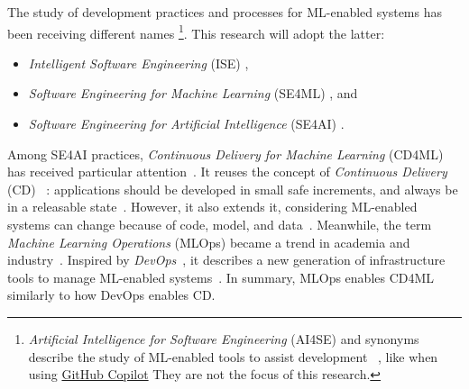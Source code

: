   The study of development practices and processes for ML-enabled systems
  has been receiving different names%
  \footnote{%
    \emph{Artificial Intelligence for Software Engineering} (AI4SE) and 
    synonyms describe the study of ML-enabled tools to assist development%
    ~\parencite{Kastner2020TeachingSystems,Martinez-Fernandez2022SoftwareSurvey},
    like when using \href{https://github.com/features/copilot}{GitHub Copilot}
    They are not the focus of this research.
  }. This research will adopt the latter:
  \begin{itemize}
    \item \emph{Intelligent Software Engineering} (ISE)
          \parencite{Andrade2021ContinuousStudy,
                     DeugoPatternsEngineering.,
                     Xie2018IntelligentEngineering},
    \item \emph{Software Engineering for Machine Learning} (SE4ML)
          \parencite{Amershi2019SoftwareStudy,
                     Lorenzoni2021MachineReview,
                     Nascimento2020SoftwareReview,
                     Martinez-Fernandez2022SoftwareSurvey,
                     Sculley2015HiddenSystems}, and
    \item \emph{Software Engineering for Artificial Intelligence} (SE4AI) 
          \parencite{Carleton2020TheSE,
                     Giray2021AChallenges,
                     Heck2020TurningEngineers,
                     Kastner2020TeachingSystems,
                     Martinez-Fernandez2022SoftwareSurvey,
                     Menzies2020TheAI}.
  \end{itemize}

  Among SE4AI practices, \emph{Continuous Delivery for Machine Learning} (CD4ML)
  has received particular attention~\parencite{Sato2019ContinuousLearning}.
  It reuses the concept of \emph{Continuous Delivery} (CD)%
  ~\parencite{Humble2010ContinuousAutomation}: applications should be developed
  in small safe increments, and always be in a releasable state~\parencite{Kim2021TheOrganizations}.
  However, it also extends it, considering ML-enabled systems can change because
  of code, model, and data~\parencite{Sato2019ContinuousLearning}.
  Meanwhile, the term \emph{Machine Learning Operations} (MLOps) became a trend
  in academia and industry~\parencite{Tamburri2020SustainableChallenges}.
  Inspired by \emph{DevOps}~\parencite{Forsgren2018Accelerate:Organizations,
  Kim2016TheTeams}, it describes a new generation of infrastructure tools
  to manage ML-enabled systems~\parencite{Gift2021PracticalModels,
  Mboweni2022ADevOps,Stenac2020IntroducingMLOps}.
  In summary, MLOps enables CD4ML similarly to how DevOps enables CD.

